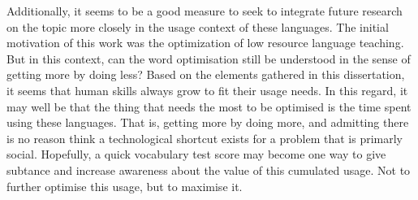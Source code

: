 Additionally, it seems to be a good measure to seek to integrate future research on the topic more closely in the usage context of these languages. The initial motivation of this work was the optimization of low resource language teaching. But in this context, can the word optimisation still be understood in the sense of getting more by doing less? Based on the elements gathered in this dissertation, it seems that human skills always grow to fit their usage needs. In this regard, it may well be that the thing that needs the most to be optimised is the time spent using these languages. That is, getting more by doing more, and admitting there is no reason think a technological shortcut exists for a problem that is primarly social. Hopefully, a quick vocabulary test score may become one way to give subtance and increase awareness about the value of this cumulated usage. Not to further optimise this usage, but to maximise it.

